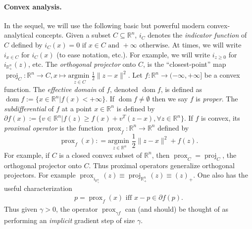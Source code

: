 \documentclass{article}
\DeclareMathOperator{\proj}{proj}
\DeclareMathOperator{\prox}{prox}
\DeclareMathOperator{\dom}{dom}
\begin{document}
\paragraph{Convex analysis.} In the sequel, we will use the following
basic but powerful modern convex-analytical
concepts.
Given a subset $C \subseteq \mathbb{R}^n$, $i_C$ denotes the
\textit{indicator function} of $C$ defined by $i_C(x) = 0 \text{ if }
x \in C\text{ and }+\infty\text{ otherwise}$.
At times, we will write $i_{x \in C}$ for $i_C(x)$ (to ease notation,
etc.). For example, we will write $i_{z \ge 0}$ for
$i_{\mathbb{R}^n_+}(z)$, etc.  The \textit{orthogonal projector} onto
$C$, is the ``closest-point'' map $\proj_C: \mathbb{R}^n \rightarrow
C, x \mapsto \underset{z \in C}{\text{argmin }}\frac{1}{2}\|z-x\|^2$.
Let $f : \mathbb{R}^n \rightarrow (-\infty, +\infty]$ be a
  convex function. The \textit{effective domain} of $f$, denoted
  $\dom f$, is defined as
$\dom f := \{x \in \mathbb{R}^n | f(x) < +\infty\}$.
 If $\dom f \ne \emptyset$ then we say $f$ is \textit{proper}.
The \textit{subdifferential} of $f$ at a point $x \in \mathbb{R}^n$ is
defined by
$\partial f(x) := \{v \in \mathbb{R}^n | f(z)  \ge f(x) + v^T(z -
x), \forall z \in \mathbb{R}^n\}$.
If $f$ is convex, its
\textit{proximal operator} is the function $\prox_f: \mathbb{R}^n
\rightarrow \mathbb{R}^n$ defined by
\begin{equation}
 \prox_f(x): = \underset{z \in
  \mathbb{R}^n}{\text{argmin }}\frac{1}{2}\|z
  - x\|^2 + f(z).
\end{equation}
For example, if $C$ is a closed convex subset of $\mathbb{R}^n$, then
$\prox_C = \proj_C$, the orthogonal projector onto $C$. Thus proximal
operators generalize orthogonal projectors. For example
$\prox_{i_{\mathbb{R}^n_+}}(z) \equiv \proj_{\mathbb{R}^n_+}(z) \equiv
(z)_+$. One also has the useful characterization
\begin{eqnarray}
  p = \prox_f(x)\text{ iff } x - p \in \partial f(p).
\end{eqnarray}
Thus given $\gamma > 0$, the operator $\prox_{\gamma f}$ can (and
should) be thought of as performing an \textit{implicit} gradient step
of size $\gamma$.
\end{document}
